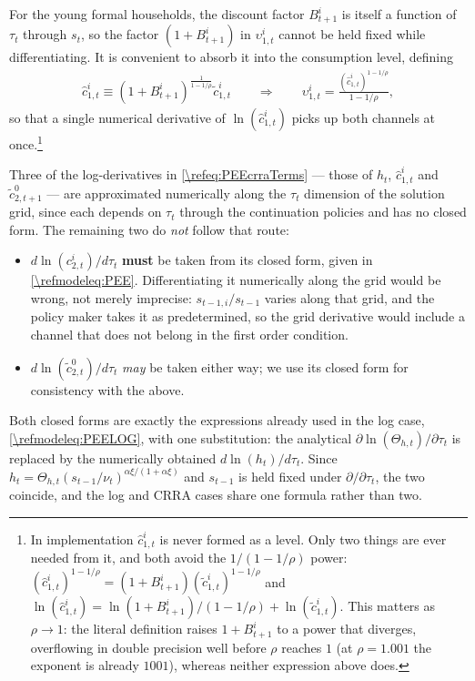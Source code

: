 \documentclass[a4paper]{article}
\begin{document}
For the young formal households, the discount factor $B_{t+1}^i$ is itself a function of $\tau_t$ through $s_t$, so the factor $(1+B_{t+1}^i)$ in $\upsilon_{1,t}^i$ cannot be held fixed while differentiating. It is convenient to absorb it into the consumption level, defining
\begin{align}\label{\refeq:hatc1i}
    \hat{c}_{1,t}^i \equiv \left(1+B_{t+1}^i\right)^{\frac{1}{1-1/\rho}}\tilde{c}_{1,t}^i \qquad\Longrightarrow\qquad \upsilon_{1,t}^i = \frac{\left(\hat{c}_{1,t}^i\right)^{1-1/\rho}}{1-1/\rho},
\end{align}
so that a single numerical derivative of $\ln(\hat{c}_{1,t}^i)$ picks up both channels at once.\footnote{In implementation $\hat{c}_{1,t}^i$ is never formed as a level. Only two things are ever needed from it, and both avoid the $1/(1-1/\rho)$ power: $\left(\hat{c}_{1,t}^i\right)^{1-1/\rho} = \left(1+B_{t+1}^i\right)\left(\tilde{c}_{1,t}^i\right)^{1-1/\rho}$ and $\ln\left(\hat{c}_{1,t}^i\right) = \ln\left(1+B_{t+1}^i\right)/(1-1/\rho)+\ln\left(\tilde{c}_{1,t}^i\right)$. This matters as $\rho\rightarrow 1$: the literal definition raises $1+B_{t+1}^i$ to a power that diverges, overflowing in double precision well before $\rho$ reaches $1$ (at $\rho = 1.001$ the exponent is already $1001$), whereas neither expression above does.}

Three of the log-derivatives in \eqref{\refeq:PEEcrraTerms} --- those of $h_t$, $\hat{c}_{1,t}^i$ and $\tilde{c}_{2,t+1}^0$ --- are approximated numerically along the $\tau_t$ dimension of the solution grid, since each depends on $\tau_t$ through the continuation policies and has no closed form. The remaining two do \emph{not} follow that route:
\begin{itemize}
    \item $d\ln(c_{2,t}^i)/d\tau_t$ \textbf{must} be taken from its closed form, given in \eqref{\refmodeleq:PEE}. Differentiating it numerically along the grid would be wrong, not merely imprecise: $s_{t-1,i}/s_{t-1}$ varies along that grid, and the policy maker takes it as predetermined, so the grid derivative would include a channel that does not belong in the first order condition.
    \item $d\ln(\tilde{c}_{2,t}^0)/d\tau_t$ \emph{may} be taken either way; we use its closed form for consistency with the above.
\end{itemize}
Both closed forms are exactly the expressions already used in the log case, \eqref{\refmodeleq:PEELOG}, with one substitution: the analytical $\partial\ln(\Theta_{h,t})/\partial\tau_t$ is replaced by the numerically obtained $d\ln(h_t)/d\tau_t$. Since $h_t = \Theta_{h,t}(s_{t-1}/\nu_t)^{\alpha\xi/(1+\alpha\xi)}$ and $s_{t-1}$ is held fixed under $\partial/\partial\tau_t$, the two coincide, and the log and CRRA cases share one formula rather than two.
\end{document}
